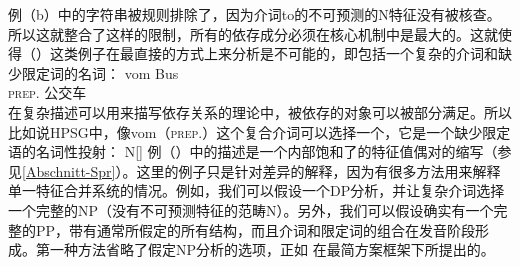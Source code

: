 例（b）中的字符串被规则排除了，因为介词to的不可预测的N特征没有被核查。所以这就整合了这样的限制，所有的依存成分必须在核心机制中是最大的。这就使得（）这类例子在最直接的方式上来分析是不可能的，即包括一个复杂的介词和缺少限定词的名词：
\ea
\gll vom Bus\\
     \textsc{prep}. 公交车\\
\z
在复杂描述可以用来描写依存关系的理论中，被依存的对象可以被部分满足。所以比如说HPSG中，像vom（\textsc{prep}.）这个复合介词可以选择一个\nbarc ，它是一个缺少限定语的名词性投射：
\ea
N[\spr {}]
\z
例（）中的描述是一个内部饱和了的特征值偶对的缩写（参见\ref{Abschnitt-Spr}）。这里的例子只是针对差异的解释，因为有很多方法用来解释单一特征合并系统的情况。例如，我们可以假设一个DP分析，并让复杂介词选择一个完整的NP（没有不可预测特征的范畴N）。另外，我们可以假设确实有一个完整的PP，带有通常所假定的所有结构，而且介词和限定词的组合在发音阶段形成。第一种方法省略了假定NP分析的选项，正如 \citet{Bruening2009a}在最简方案框架下所提出的。

